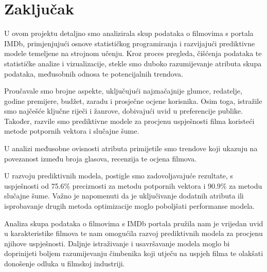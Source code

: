 \chapter{Zaključak}

U ovom projektu detaljno smo analizirala skup podataka o filmovima s portala IMDb, primjenjujući osnove statističkog programiranja i razvijajući prediktivne modele temeljene na strojnom učenju. Kroz proces pregleda, čišćenja podataka te statističke analize i vizualizacije, stekle smo duboko razumijevanje atributa skupa podataka, međusobnih odnosa te potencijalnih trendova.

Proučavale smo brojne aspekte, uključujući najznačajnije glumce, redatelje, godine premijere, budžet, zaradu i prosječne ocjene korisnika. Osim toga, istražile smo najčešće ključne riječi i žanrove, dobivajući uvid u preferencije publike. Također, razvile smo prediktivne modele za procjenu uspješnosti filma koristeći metode potpornih vektora i slučajne šume.

U analizi međusobne ovisnosti atributa primijetile smo trendove koji ukazuju na povezanost između broja glasova, recenzija te ocjena filmova. 

U razvoju prediktivnih modela, postigle smo zadovoljavajuće rezultate, s uspješnosti od 75.6\% preciznosti za metodu potpornih vektora i 90.9\% za metodu slučajne šume. Važno je napomenuti da je uključivanje dodatnih atributa ili isprobavanje drugih metoda optimizacije moglo poboljšati performanse modela.

Analiza skupa podataka o filmovima s IMDb portala pružila nam je vrijedan uvid u karakteristike filmova te nam omogućila razvoj prediktivnih modela za procjenu njihove uspješnosti. Daljnje istraživanje i usavršavanje modela moglo bi doprinijeti boljem razumijevanju čimbenika koji utječu na uspjeh filma te olakšati donošenje odluka u filmskoj industriji.